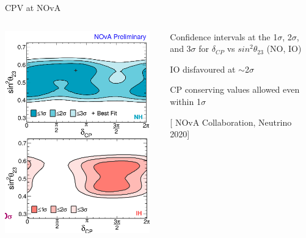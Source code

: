 \begin{frame}{CPV at NOvA}

  \begin{columns}[T]
    \begin{column}{0.45\textwidth}
      \begin{center}
         \includegraphics[width=0.95\textwidth]{./images/3nu/accelerator/nova_cpv_2020}\\
      \end{center}
    \end{column}
    \begin{column}{0.55\textwidth}
      \begin{itemize}
        {\small
        \item Confidence intervals at the 1$\sigma$, 2$\sigma$, and 3$\sigma$
              for $\delta_{CP}$ vs $sin^{2}\theta_{23}$ (NO, IO)
        \begin{itemize}
          {\small
          \item IO disfavoured at $\sim$2$\sigma$
          \item CP conserving values allowed even within 1$\sigma$
          }
        \end{itemize}
        }
      \end{itemize}
      [{\color{blue} \scriptsize NOvA Collaboration, Neutrino 2020}]\\


\end{column}
\end{columns}
\end{frame}
